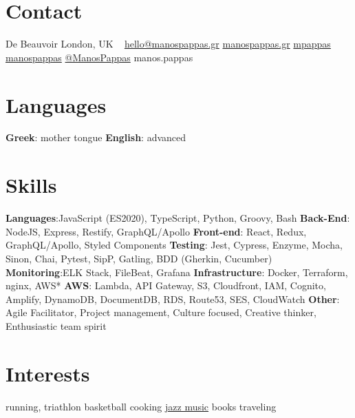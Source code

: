
\newcommand*{\img}[1]{%
    \raisebox{-.1\baselineskip}{%
        \texttt{[image: \#1]}%
    }%
}


\begin{aside} %
\section{\normalfont Contact}
 De Beauvoir
London, UK
~
 \hspace{0.02cm} \myNumberUK
{} \hspace{0.02cm} \href{mailto:\myEmail}{hello@manospappas.gr}
 \hspace{0.02cm} \href{https://www.manospappas.gr/}{manospappas.gr}
 \hspace{0.02cm} \href{https://github.com/mpappas}{ mpappas}
 \hspace{0.02cm} \href{https://www.linkedin.com/in/manos-pappas}{ manospappas}
 \hspace{0.02cm} \href{https://twitter.com/ManoPappas}{ @ManosPappas}
\raisebox{-0.4ex}{\skype{}} manos.pappas
~

\section{\normalfont Languages}
\textbf{Greek}: mother tongue
\textbf{English}: advanced
~

\section{\normalfont Skills}
\textbf{Languages}:JavaScript (ES2020), TypeScript, Python, Groovy, Bash
\textbf{Back-End}: NodeJS, Express, Restify, GraphQL/Apollo
\textbf{Front-end}: React, Redux, GraphQL/Apollo, Styled Components
\textbf{Testing}: Jest, Cypress, Enzyme, Mocha, Sinon, Chai, Pytest, SipP, Gatling, BDD (Gherkin, Cucumber)
\textbf{Monitoring}:ELK Stack, FileBeat, Grafana
\textbf{Infrastructure}: Docker, Terraform, nginx, AWS*
\textbf{AWS}: Lambda, API Gateway, S3, Cloudfront, IAM, Cognito, Amplify, DynamoDB, DocumentDB, RDS, Route53, SES, CloudWatch
\textbf{Other}: Agile Facilitator, Project management, Culture focused, Creative thinker, Enthusiastic team spirit
~
\vspace{-0.01cm}
\section{\normalfont Interests}
running, triathlon
basketball
cooking
\href{https://open.spotify.com/playlist/3FU39afuJQ9EGzF7SDDUQ8?si=0TY3q524RxW042HSjm-bhQ}{jazz music}
books
traveling
~
\end{aside}

